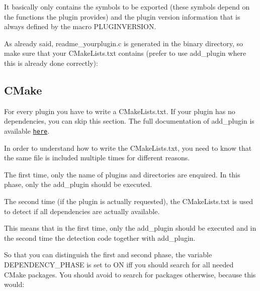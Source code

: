 It basically only contains the symbols to be exported (these symbols depend on the functions the plugin provides) and the plugin version information that is always defined by the macro {\ttfamily P\+L\+U\+G\+I\+N\+V\+E\+R\+S\+I\+ON}.

As already said, {\ttfamily readme\+\_\+yourplugin.\+c} is generated in the binary directory, so make sure that your {\ttfamily C\+Make\+Lists.\+txt} contains (prefer to use {\ttfamily add\+\_\+plugin} where this is already done correctly)\+:




\subsection*{C\+Make}

For every plugin you have to write a {\ttfamily C\+Make\+Lists.\+txt}. If your plugin has no dependencies, you can skip this section. The full documentation of {\ttfamily add\+\_\+plugin} is available \href{/home/markus/Projekte/Elektra/current/cmake/Modules/LibAddPlugin.cmake}{\tt here}.

In order to understand how to write the {\ttfamily C\+Make\+Lists.\+txt}, you need to know that the same file is included multiple times for different reasons.


\begin{DoxyEnumerate}
\item The first time, only the name of plugins and directories are enquired. In this phase, only the {\ttfamily add\+\_\+plugin} should be executed.
\item The second time (if the plugin is actually requested), the {\ttfamily C\+Make\+Lists.\+txt} is used to detect if all dependencies are actually available.
\end{DoxyEnumerate}

This means that in the first time, only the {\ttfamily add\+\_\+plugin} should be executed and in the second time the detection code together with {\ttfamily add\+\_\+plugin}.

So that you can distinguish the first and second phase, the variable {\ttfamily D\+E\+P\+E\+N\+D\+E\+N\+C\+Y\+\_\+\+P\+H\+A\+SE} is set to {\ttfamily ON} iff you should search for all needed C\+Make packages. You should avoid to search for packages otherwise, because this would\+:


